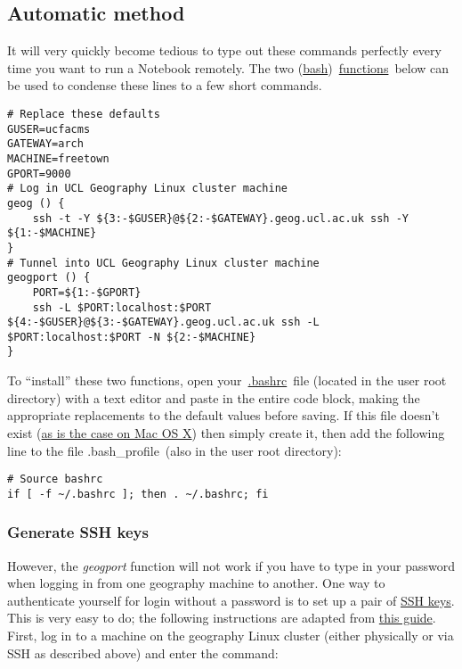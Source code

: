 \documentclass[10pt,a4]{article}
\begin{document}
\subsection{Automatic method}

\label{362547}

It will very quickly become tedious to type out these commands perfectly
every time you want to run a Notebook remotely. The two
(\href{http://cs.lmu.edu/~ray/notes/bash/}{bash})~\href{https://www.shellscript.sh/functions.html}{functions}~below
can be used to condense these lines to a few short commands.


\begin{lstlisting}
# Replace these defaults
GUSER=ucfacms
GATEWAY=arch
MACHINE=freetown
GPORT=9000
# Log in UCL Geography Linux cluster machine
geog () {
    ssh -t -Y ${3:-$GUSER}@${2:-$GATEWAY}.geog.ucl.ac.uk ssh -Y ${1:-$MACHINE}
}
# Tunnel into UCL Geography Linux cluster machine
geogport () {
    PORT=${1:-$GPORT}
    ssh -L $PORT:localhost:$PORT ${4:-$GUSER}@${3:-$GATEWAY}.geog.ucl.ac.uk ssh -L $PORT:localhost:$PORT -N ${2:-$MACHINE}
}

\end{lstlisting}

To ``install'' these two functions, open
your~\href{http://superuser.com/questions/49289/what-is-the-bashrc-file}{.bashrc}~file
(located in the user root directory) with a text editor and paste in the
entire code block, making the appropriate replacements to the default
values before saving. If this file doesn't exist
(\href{http://apple.stackexchange.com/a/119714}{as is the case on Mac OS
X}) then simply create it, then add the following line to the file
.bash\_profile~(also in the user root directory):


\begin{lstlisting}
# Source bashrc
if [ -f ~/.bashrc ]; then . ~/.bashrc; fi
\end{lstlisting}

\subsubsection{Generate SSH keys}

\label{951039}

However, the \emph{geogport} function will not work if you have to type
in your password when logging in from one geography machine to another.
One way to authenticate yourself for login without a password is to set
up a pair of \href{https://wiki.archlinux.org/index.php/SSH_keys}{SSH
keys}. This is very easy to do; the following instructions are adapted
from
\href{https://www.digitalocean.com/community/tutorials/how-to-set-up-ssh-keys--2}{this
guide}. First, log in to a machine on the geography Linux cluster
(either physically or via SSH as described above) and enter the
command:~
\end{document}
